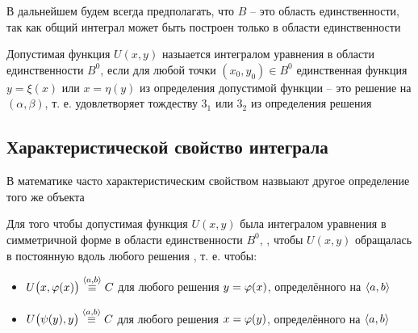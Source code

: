 В дальнейшем будем всегда предполагать, что $ B $ -- это область единственности, так как общий интеграл может быть построен только в области единственности

\begin{definition}
    Допустимая функция $ U(x, y) $ назыается интегралом уравнения  в области единственности $ B^0 $, если для любой точки $ (x_0, y_0) \in B^0 $ единственная функция $ y = \xi(x) $ или $ x = \eta(y) $ из определения допустимой функции -- это решение  на $ (\alpha, \beta) $, т. е. удовлетворяет тождеству $ 3_1 $ или $ 3_2 $ из определения решения
\end{definition}

\subsection{Характеристической свойство интеграла}

\begin{note}
	В математике часто характеристическим свойством назвыают другое определение того же объекта
\end{note}

\begin{theorem}
    Для того чтобы допустимая функция $ U(x, y) $ была интегралом уравнения в симметричной форме  в области единственности $ B^0 $, , чтобы $ U(x, y) $ обращалась в постоянную вдоль любого решения , т. е. чтобы:
    \begin{itemize}
        \item $ U \big( x, \varphi(x) \big) \overset{\Braket{a, b}}\equiv C $ для любого решения $ y = \varphi(x) $, определённого на $ \Braket{a, b} $
        \item $ U \big( \psi(y), y \big) \overset{\Braket{a, b}}\equiv C $ для любого решения $ x = \varphi(y) $, определённого на $ \Braket{a, b} $
    \end{itemize}
\end{theorem}

